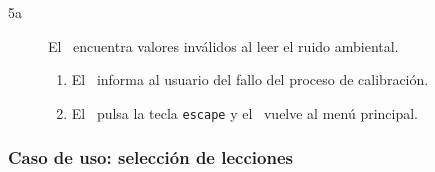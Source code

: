 \begin{description}
\begin{description}
  \item [5a] El \sistema\ encuentra valores inválidos al leer el ruido
    ambiental.
    \begin{enumerate}
    \item El \sistema\ informa al usuario del fallo del proceso de calibración.
    \item El \jugador\ pulsa la tecla \texttt{escape} y el \sistema\ vuelve al
      menú principal.
    \end{enumerate}
  \end{description}  
\end{description}

\subsubsection{Caso de uso: selección de lecciones}
